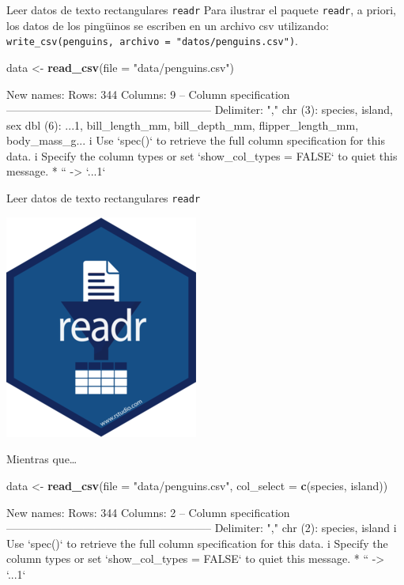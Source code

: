 \documentclass[
  ignorenonframetext,
  aspectratio=169]{beamer}
\newenvironment{Shaded}{\begin{snugshade}}{\end{snugshade}}
\newcommand{\AttributeTok}[1]{\textcolor[rgb]{0.13,0.29,0.53}{#1}}
\newcommand{\FunctionTok}[1]{\textcolor[rgb]{0.13,0.29,0.53}{\textbf{#1}}}
\newcommand{\NormalTok}[1]{#1}
\newcommand{\OtherTok}[1]{\textcolor[rgb]{0.56,0.35,0.01}{#1}}
\newcommand{\StringTok}[1]{\textcolor[rgb]{0.31,0.60,0.02}{#1}}
\let\oldverbatim\verbatim
\let\endoldverbatim\endverbatim
\renewenvironment{verbatim}{\tiny\oldverbatim}{\endoldverbatim}
\begin{document}
\begin{frame}[fragile]{Leer datos de texto rectangulares \texttt{readr}}
\label{leer-datos-de-texto-rectangulares-readr-3}
Para ilustrar el paquete \texttt{readr}, a priori, los datos de los
pingüinos se escriben en un archivo csv utilizando:
\texttt{write\_csv(penguins,\ archivo\ =\ "datos/penguins.csv")}.

\begin{Shaded}
\begin{Highlighting}[]
\NormalTok{data }\OtherTok{\textless{}{-}} \FunctionTok{read\_csv}\NormalTok{(}\AttributeTok{file =} \StringTok{"data/penguins.csv"}\NormalTok{)}
\end{Highlighting}
\end{Shaded}

\begin{verbatim}
New names:
Rows: 344 Columns: 9
-- Column specification
-------------------------------------------------------- Delimiter: "," chr
(3): species, island, sex dbl (6): ...1, bill_length_mm, bill_depth_mm,
flipper_length_mm, body_mass_g...
i Use `spec()` to retrieve the full column specification for this data. i
Specify the column types or set `show_col_types = FALSE` to quiet this message.
* `` -> `...1`
\end{verbatim}
\end{frame}

\begin{frame}[fragile]{Leer datos de texto rectangulares \texttt{readr}}
\label{leer-datos-de-texto-rectangulares-readr-4}
\begin{flushright}\includegraphics[width=0.05\linewidth]{Imgs/logo_readr} \end{flushright}

Mientras que\ldots{}

\begin{Shaded}
\begin{Highlighting}[]
\NormalTok{data }\OtherTok{\textless{}{-}} \FunctionTok{read\_csv}\NormalTok{(}\AttributeTok{file =} \StringTok{"data/penguins.csv"}\NormalTok{, }\AttributeTok{col\_select =} \FunctionTok{c}\NormalTok{(species, island))}
\end{Highlighting}
\end{Shaded}

\begin{verbatim}
New names:
Rows: 344 Columns: 2
-- Column specification
-------------------------------------------------------- Delimiter: "," chr
(2): species, island
i Use `spec()` to retrieve the full column specification for this data. i
Specify the column types or set `show_col_types = FALSE` to quiet this message.
* `` -> `...1`
\end{verbatim}
\end{frame}
\end{document}
